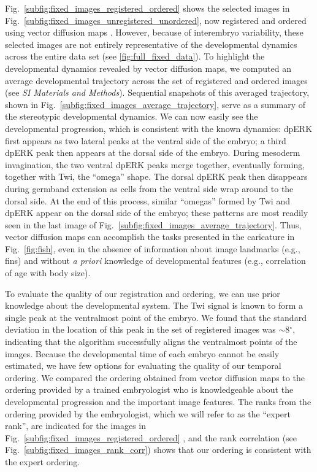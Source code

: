 \documentclass[twocolumn, 10pt]{article}
\newcommand{\SI}[0]{\textit{SI Materials and Methods}}
\newcommand{\fig}[0]{Fig.}
\begin{document}
\fig~\ref{subfig:fixed_images_registered_ordered} shows the selected images in \fig~\ref{subfig:fixed_images_unregistered_unordered}, now registered and ordered using vector diffusion maps \citep{singer2012vector}.
%
However, because of interembryo variability, these selected images are not entirely representative of the developmental dynamics across the entire data set (see \ref{fig:full_fixed_data}).
%
To highlight the developmental dynamics revealed by vector diffusion maps, we computed an average developmental trajectory across the set of registered and ordered images (see \SI). 
%
Sequential snapshots of this averaged trajectory, shown in \fig~\ref{subfig:fixed_images_average_trajectory}, serve as a summary of the stereotypic developmental dynamics.
%
We can now easily see the developmental progression, which is consistent with the known dynamics: 
dpERK first appears as two lateral peaks at the ventral side of the embryo; a third dpERK peak then appears at the dorsal side of the embryo.
%
During mesoderm invagination, the two ventral dpERK peaks merge together, eventually forming, together with Twi, the ``omega'' shape.
%
The dorsal dpERK peak then disappears during germband extension as cells from the ventral side wrap around to the dorsal side.
%
At the end of this process, similar ``omegas'' formed by Twi and dpERK appear on the dorsal side of the embryo; these patterns are most readily seen in the last image of \fig~\ref{subfig:fixed_images_average_trajectory}.
%
Thus, vector diffusion maps can accomplish the tasks presented in the caricature in \fig~\ref{fig:fish}, even in the absence of information about image landmarks (e.g., fins) and without {\it a priori} knowledge of developmental features (e.g., correlation of age with body size).

To evaluate the quality of our registration and ordering, we can use prior knowledge about the developmental system. 
%
The Twi signal is known to form a single peak at the ventralmost point of the embryo. 
%
We found that the standard deviation in the location of this peak in the set of registered images was $\sim$8$^\circ$,
indicating that the algorithm successfully aligns the ventralmost points of the images. 
%
Because the developmental time of each embryo cannot be easily estimated, we have few options for evaluating the quality of our temporal ordering. 
%
We compared the ordering obtained from vector diffusion maps to the ordering provided by a trained embryologist who is knowledgeable about the developmental progression and the important image features.  
%
The ranks from the ordering provided by the embryologist, which we will refer to as the ``expert rank'', are indicated for the images in \fig~\ref{subfig:fixed_images_registered_ordered} , and the rank correlation (see \fig~\ref{subfig:fixed_images_rank_corr}) shows that our ordering is consistent with the expert ordering. 
\end{document}

